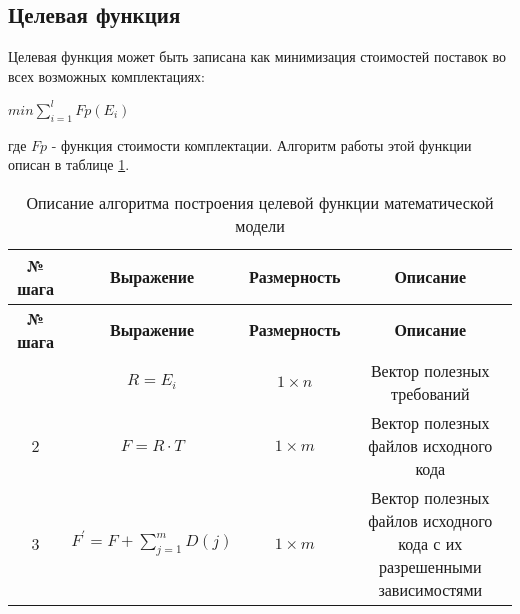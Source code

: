 \subsection*{Целевая функция}
Целевая функция может быть записана как минимизация стоимостей поставок во всех возможных комплектациях:
\begin{center}
    $\displaystyle min \sum^{l}_{i = 1} Fp(E_{i})$
\end{center}

где $Fp$ - функция стоимости комплектации. Алгоритм работы этой функции описан в таблице \ref{tab:objective}.

\begin{longtable}{|c|c|c|c|}
    \caption{Описание алгоритма построения целевой функции математической модели}
    \label{tab:objective} \\   
    \hline
    \bfseries{№ шага} & \bfseries{Выражение} & \bfseries{Размерность} & \bfseries{Описание} \\
    \endfirsthead
    \bfseries{№ шага} & \bfseries{Выражение} & \bfseries{Размерность} & \bfseries{Описание} \\
    \endhead
    \endfoot
    \hline
    1 & $R = E_{i}$ & $1 \times n$ & Вектор полезных требований \\
    \hline
    2 & $F = R \cdot T$ & $1 \times m$ & Вектор полезных файлов исходного кода \\
    \hline
    3 & $\displaystyle F^{\prime} = F + \sum^{m}_{j = 1}D(j)$ & $1 \times m$ & Вектор полезных файлов исходного кода с их разрешенными зависимостями \\
\end{longtable}



